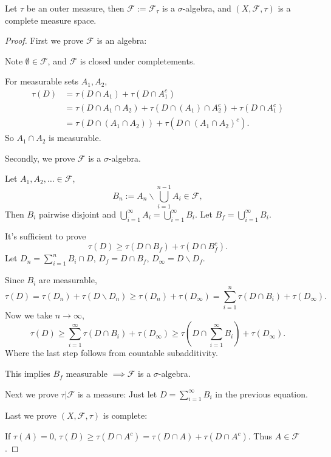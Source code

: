 \begin{theorem}
    Let $\tau$ be an outer measure, then $\mathscr{F}:=\mathscr{F}_\tau$ is
	a $\sigma$-algebra, and $(X,\mathscr{F},\tau)$ is a complete measure space.
\end{theorem}
\begin{proof}[Proof]
    First we prove $\mathscr{F}$ is an algebra:

	Note $\emptyset\in \mathscr{F}$, and  $\mathscr{F}$ is closed under completements.

	For measurable sets $A_1,A_2$,
	\begin{align*}
	\tau(D) &= \tau(D\cap A_1)+\tau(D\cap A_1^c)\\
	&= \tau(D\cap A_1\cap A_2)+\tau(D\cap(A_1)\cap A_2^c)+\tau(D\cap A_1^c)\\
	&= \tau(D\cap (A_1\cap A_2)) + \tau(D\cap (A_1\cap A_2)^c).
	\end{align*}
	So $A_1\cap A_2$ is measurable.

	Secondly, we prove $\mathscr{F}$ is a $\sigma$-algebra.

	Let $A_1,A_2,\dots\in \mathscr{F}$,
	\[
	B_n := A_n \backslash \bigcup_{i=1}^{n-1}A_i \in \mathscr{F},
	\]
	Then $B_i$ pairwise disjoint and $\bigcup_{i=1}^\infty A_i = \bigcup_{i=1}^\infty B_i$.
	Let $B_f = \bigcup_{i=1}^\infty B_i$.

	It's sufficient to prove
	\[
	\tau(D) \ge \tau(D\cap B_f) + \tau(D\cap B_f^c).
	\]
	Let $D_n = \sum_{i=1}^n B_i \cap D$, $D_f=D\cap B_f$,
	$D_\infty = D \backslash D_f$.

	Since $B_i$ are measurable,
	\[
	\tau(D) = \tau(D_n) + \tau(D \backslash D_n)
	\ge \tau(D_n) + \tau(D_\infty) = \sum_{i=1}^{n} \tau(D\cap B_i) + \tau(D_\infty).
	\]
	Now we take $n\to \infty$,
	\[
	\tau(D)\ge \sum_{i=1}^{\infty} \tau(D\cap B_i) + \tau(D_\infty)
	\ge \tau\left(D\cap \sum_{i=1}^{\infty} B_i\right) + \tau(D_\infty).
	\]
	Where the last step follows from countable subadditivity.

	This implies $B_f$ measurable $\implies \mathscr{F}$ is a $\sigma$-algebra.

	Next we prove $\tau|\mathscr{F}$ is a measure:
	Just let $D = \sum_{i=1}^{\infty} B_i$ in the previous equation.

	Last we prove $(X,\mathscr{F},\tau)$ is complete:

	If $\tau(A) = 0$, $\tau(D)\ge \tau(D\cap A^c) = \tau(D\cap A) + \tau(D\cap A^c)$.
	Thus $A\in \mathscr{F}$.
\end{proof}

